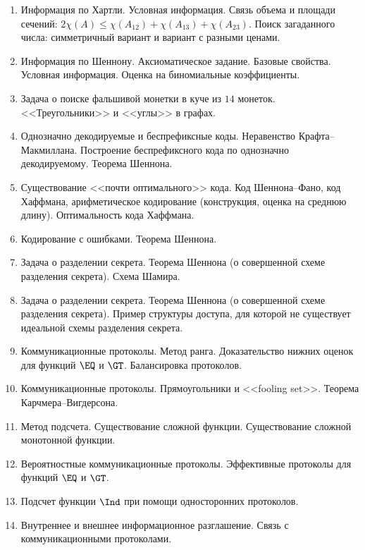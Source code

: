





\begin{enumerate}
    \item Информация по Хартли. Условная информация. Связь объема и площади сечений: $2 \chi(A) \le
        \chi(A_{12}) + \chi(A_{13}) + \chi(A_{23})$. Поиск загаданного числа: симметричный вариант и
        вариант с разными ценами.
    \item Информация по Шеннону. Аксиоматическое задание. Базовые свойства. Условная информация.
        Оценка на биномиальные коэффициенты.
    \item Задача о поиске фальшивой монетки в куче из $14$ монеток. <<Треугольники>> и <<углы>> в
        графах.
    \item Однозначно декодируемые и беспрефиксные коды. Неравенство Крафта--Макмиллана.
        Построение беспрефиксного кода по однозначно декодируемому. Теорема Шеннона.
    \item Существование <<почти оптимального>> кода. Код Шеннона--Фано, код Хаффмана, арифметическое
        кодирование (конструкция, оценка на среднюю длину). Оптимальность кода Хаффмана.
    \item Кодирование с ошибками. Теорема Шеннона.
    \item Задача о разделении секрета. Теорема Шеннона (о совершенной схеме разделения секрета). Схема Шамира.
    \item Задача о разделении секрета. Теорема Шеннона (о совершенной схеме разделения секрета). Пример
        структуры доступа, для которой не существует идеальной схемы разделения секрета.
    \item Коммуникационные протоколы. Метод ранга. Доказательство нижних оценок для функций $\EQ$ и
        $\GT$. Балансировка протоколов.
    \item Коммуникационные протоколы. Прямоугольники и <<fooling set>>. Теорема Карчмера--Вигдерсона.
    \item Метод подсчета. Существование сложной функции. Существование сложной монотонной функции.
    \item Вероятностные коммуникационные протоколы. Эффективные протоколы для функций $\EQ$ и
        $\GT$.
    \item Подсчет функции $\Ind$ при помощи односторонних протоколов.
    \item Внутреннее и внешнее информационное разглашение. Связь с коммуникационными протоколами.

\end{enumerate}
